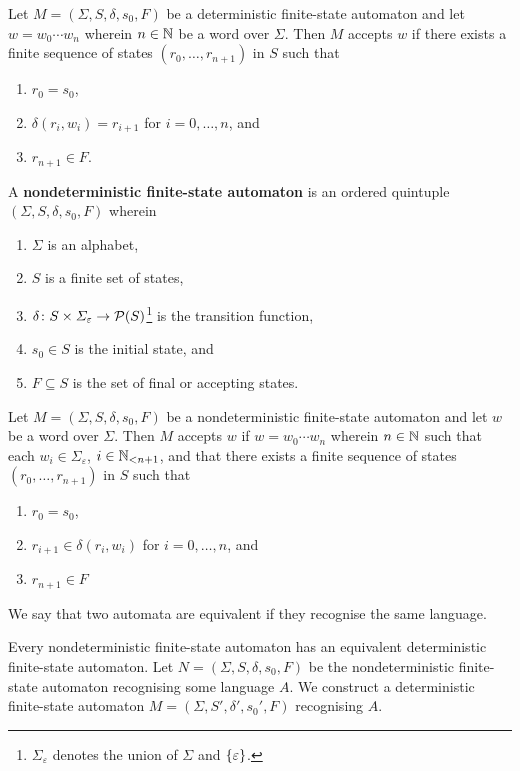Let \(M = (\varSigma, S, \delta, s_0, F)\) be a deterministic finite-state
automaton and let \(w = w_0 \cdots w_n\) wherein \(n \in \setnat\) be a word
over \(\varSigma\).  Then \(M\) accepts \(w\) if there exists a finite sequence
of states \((r_0, \ldots, r_{n + 1})\) in \(S\) such that
\begin{enumerate}
    \item \(r_0 = s_0\),
    \item \(\delta(r_i, w_i) = r_{i + 1}\) for \(i = 0, \ldots, n\), and
    \item \(r_{n + 1} \in F\).
\end{enumerate}

\Bdf
    A {\bf nondeterministic finite-state automaton} is an ordered quintuple
    \((\varSigma, S, \delta, s_0, F)\) wherein
    \begin{enumerate}
        \item \(\varSigma\) is an alphabet,
        \item \(S\) is a finite set of states,
        \item \(\map{\delta}{S \times
        \varSigma_\varepsilon}{\pow(S)}\)\footnote{\(\varSigma_\varepsilon\)
        denotes the union of \(\varSigma\) and \(\set{\varepsilon}\).} is the
        transition function,
        \item \(s_0 \in S\) is the initial state, and
        \item \(F \subseteq S\) is the set of final or accepting states.
    \end{enumerate}
\Edf

Let \(M = (\varSigma, S, \delta, s_0, F)\) be a nondeterministic finite-state
automaton and let \(w\) be a word over \(\varSigma\). Then \(M\) accepts \(w\)
if \(w = w_0 \cdots w_n\) wherein \(n \in \setnat\) such that each \(w_i \in
\varSigma_\varepsilon\), \(i \in \Nln[n + 1]\), and that there exists a finite
sequence of states \((r_0, \ldots, r_{n + 1})\) in \(S\) such that
\begin{enumerate}
    \item \(r_0 = s_0\),
    \item \(r_{i + 1} \in \delta(r_i, w_i)\) for \(i = 0, \ldots, n\), and
    \item \(r_{n + 1} \in F\)
\end{enumerate}

We say that two automata are equivalent if they recognise the same language.

\Bth
    Every nondeterministic finite-state automaton has an equivalent
    deterministic finite-state automaton.
\Eth
\Bpr
    Let \(N = (\varSigma, S, \delta, s_0, F)\) be the nondeterministic
    finite-state automaton recognising some language \(A\). We construct a
    deterministic finite-state automaton \(M = (\varSigma, S', \delta', s_0',
    F)\) recognising \(A\).


